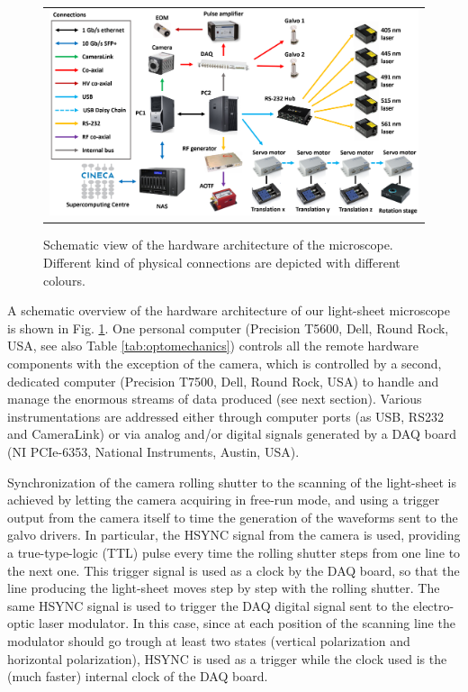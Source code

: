 \documentclass[12pt]{spieman}  %
\begin{document}
	\begin{figure}
   \begin{center}
   \begin{tabular}{c}
   \includegraphics[width=\textwidth]{connectivity.eps}
   \end{tabular}
   \end{center}
   \caption{\label{fig:connectivity} Schematic view of the hardware architecture of the microscope. Different kind of physical connections are depicted with different colours.} 
   \end{figure}

A schematic overview of the hardware architecture of our light-sheet microscope is shown in Fig. \ref{fig:connectivity}. One personal computer (Precision T5600, Dell, Round Rock, USA, see also Table \ref{tab:optomechanics}) controls all the remote hardware components with the exception of the camera, which is controlled by a second, dedicated computer (Precision T7500, Dell, Round Rock, USA) to handle and manage the enormous streams of data produced (see next section). Various instrumentations are addressed either through computer ports (as USB, RS232 and CameraLink) or via analog and/or digital signals generated by a DAQ board (NI PCIe-6353, National Instruments, Austin, USA).

Synchronization of the camera rolling shutter to the scanning of the light-sheet is achieved by letting the camera acquiring in free-run mode, and using a trigger output from the camera itself to time the generation of the waveforms sent to the galvo drivers. In particular, the HSYNC signal from the camera is used, providing a true-type-logic (TTL) pulse every time the rolling shutter steps from one line to the next one. This trigger signal is used as a clock by the DAQ board, so that the line producing the light-sheet moves step by step with the rolling shutter. The same HSYNC signal is used to trigger the DAQ digital signal sent to the electro-optic laser modulator. In this case, since at each position of the scanning line the modulator should go trough at least two states (vertical polarization and horizontal polarization), HSYNC is used as a trigger while the clock used is the (much faster) internal clock of the DAQ board.
\end{document}
